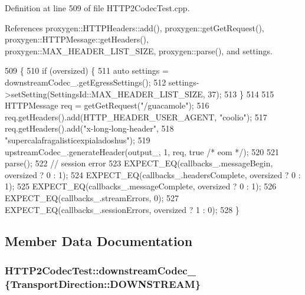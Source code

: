 Definition at line 509 of file H\+T\+T\+P2\+Codec\+Test.\+cpp.



References proxygen\+::\+H\+T\+T\+P\+Headers\+::add(), proxygen\+::get\+Get\+Request(), proxygen\+::\+H\+T\+T\+P\+Message\+::get\+Headers(), proxygen\+::\+M\+A\+X\+\_\+\+H\+E\+A\+D\+E\+R\+\_\+\+L\+I\+S\+T\+\_\+\+S\+I\+ZE, proxygen\+::parse(), and settings.


\begin{DoxyCode}
509                                                       \{
510   \textcolor{keywordflow}{if} (oversized) \{
511     \textcolor{keyword}{auto} settings = downstreamCodec_.getEgressSettings();
512     settings->setSetting(SettingsId::MAX\_HEADER\_LIST\_SIZE, 37);
513   \}
514 
515   HTTPMessage req = getGetRequest(\textcolor{stringliteral}{"/guacamole"});
516   req.getHeaders().add(HTTP\_HEADER\_USER\_AGENT, \textcolor{stringliteral}{"coolio"});
517   req.getHeaders().add(\textcolor{stringliteral}{"x-long-long-header"},
518                        \textcolor{stringliteral}{"supercalafragalisticexpialadoshus"});
519   upstreamCodec_.generateHeader(output_, 1, req, \textcolor{keyword}{true} \textcolor{comment}{/* eom */});
520 
521   parse();
522   \textcolor{comment}{// session error}
523   EXPECT\_EQ(callbacks_.messageBegin, oversized ? 0 : 1);
524   EXPECT\_EQ(callbacks_.headersComplete, oversized ? 0 : 1);
525   EXPECT\_EQ(callbacks_.messageComplete, oversized ? 0 : 1);
526   EXPECT\_EQ(callbacks_.streamErrors, 0);
527   EXPECT\_EQ(callbacks_.sessionErrors, oversized ? 1 : 0);
528 \}
\end{DoxyCode}


\subsection{Member Data Documentation}
\subsubsection[{downstream\+Codec\+\_\+}]{ H\+T\+T\+P2\+Codec\+Test\+::downstream\+Codec\+\_\+ \{Transport\+Direction\+::\+D\+O\+W\+N\+S\+T\+R\+E\+AM\}\hspace{0.3cm}{\ttfamily [protected]}}\label{classHTTP2CodecTest_a84a7be1874ac89c9c01389dabb327e4a}


